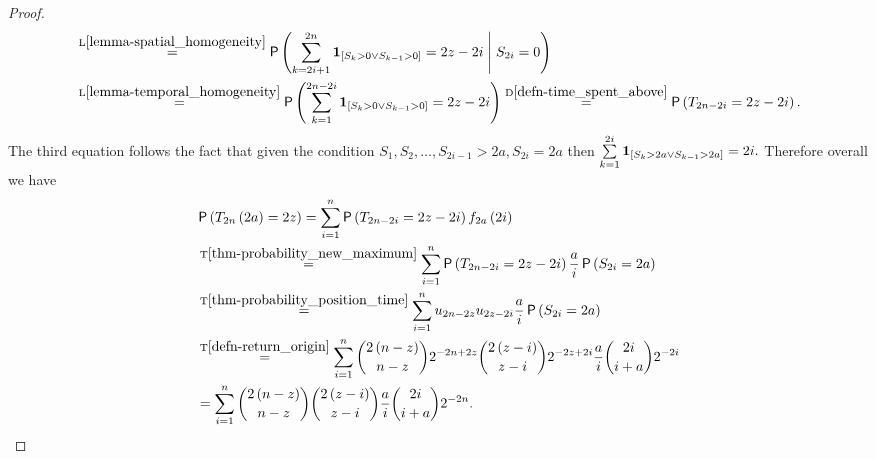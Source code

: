 \begin{proof}
\[\begin{split}
          &\overset{\text{L}\ref{lemma-spatial_homogeneity}}{=}\pr \left(\suma[k][2i+1][2n] \indikator{S_k>0 \lor S_{k-1}>0}=2z-2i \Mid S_{2i}=0\right)\\
          &\overset{\text{L}\ref{lemma-temporal_homogeneity}}{=}\pr \left(\suma[k][1][2n-2i] \indikator{S_k>0 \lor S_{k-1}>0}=2z-2i\right)
          \overset{\text{D}\ref{defn-time_spent_above}}{=}\pr \left(T_{2n-2i}=2z-2i\right).\\
      \end{split}
    \]
    The third equation follows the fact that given the condition $S_1,S_2, \ldots, S_{2i-1}>2a, S_{2i}=2a$ then $\suma[k][1][2i] \indikator{S_k>2a \lor S_{k-1}>2a}=2i.$
    Therefore overall we have
    \[
      \begin{split}
        &\pr \left(T_{2n}\left(2a\right)=2z\right)=\suma\pr \left(T_{2n-2i}=2z-2i\right) f_{2a}\left(2i\right)\\
        &\overset{\text{T}\ref{thm-probability_new_maximum}}{=}\suma\pr \left(T_{2n-2i}=2z-2i\right)\frac{a}{i}\pr \left(S_{2i}=2a\right)\\
        &\overset{\text{T}\ref{thm-probability_position_time}}{=}\suma u_{2n-2z} u_{2z-2i}\frac{a}{i}\pr \left(S_{2i}=2a\right)\\
        &\overset{\text{T}\ref{defn-return_origin}}{=}\suma \binom{2\left(n-z\right)}{n-z}2^{-2n+2z} \binom{2\left(z-i\right)}{z-i}2^{-2z+2i} \frac{a}{i} \binom{2i}{i+a}2^{-2i}\\
        &=\suma \binom{2\left(n-z\right)}{n-z}\binom{2\left(z-i\right)}{z-i}\frac{a}{i}\binom{2i}{i+a}2^{-2n}.\\
      \end{split}
      \]
\end{proof}

